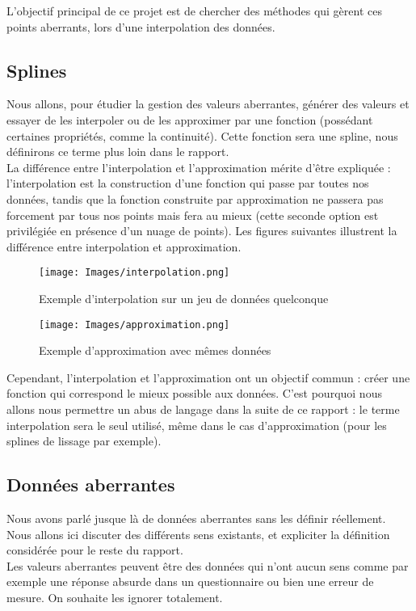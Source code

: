 \documentclass[a4paper,12pt]{article} %
\begin{document}
        L'objectif principal de ce projet est de chercher des méthodes qui gèrent ces points aberrants, lors d'une interpolation des données.
		\subsection{Splines}
		    Nous allons, pour étudier la gestion des valeurs aberrantes, générer des valeurs et essayer de les interpoler ou de les approximer par une fonction (possédant certaines propriétés, comme la continuité). Cette fonction sera une spline, nous définirons ce terme plus loin dans le rapport.\\
		    
			 La différence entre l'interpolation et l'approximation mérite d'être expliquée : l'interpolation est la construction d'une fonction qui passe par toutes nos données, tandis que la fonction construite par approximation ne passera pas forcement par tous nos points mais fera au mieux (cette seconde option est privilégiée en présence d'un nuage de points). Les figures suivantes illustrent la différence entre interpolation et approximation.
			 
			  \begin{figure}[h]
                    \centering
                    \texttt{[image: Images/interpolation.png]}
                    \caption{Exemple d'interpolation sur un jeu de données quelconque}
                    \texttt{[image: Images/approximation.png]}
                    \caption{Exemple d'approximation avec mêmes données}
                \end{figure}
			 
			 Cependant, l'interpolation et l'approximation ont un objectif commun : créer une fonction qui correspond le mieux possible aux données. C'est pourquoi nous allons nous permettre un abus de langage dans la suite de ce rapport : le terme interpolation sera le seul utilisé, même dans le cas d'approximation (pour les splines de lissage par exemple).
			 
		\subsection{Données aberrantes}
		    Nous avons parlé jusque là de données aberrantes sans les définir réellement. Nous allons ici discuter des différents sens existants, et expliciter la définition considérée pour le reste du rapport.\\
		    
		    Les valeurs aberrantes peuvent être des données qui n'ont aucun sens comme par exemple une réponse absurde dans un questionnaire ou bien une erreur de mesure. On souhaite les ignorer totalement. 
		    
\end{document}
